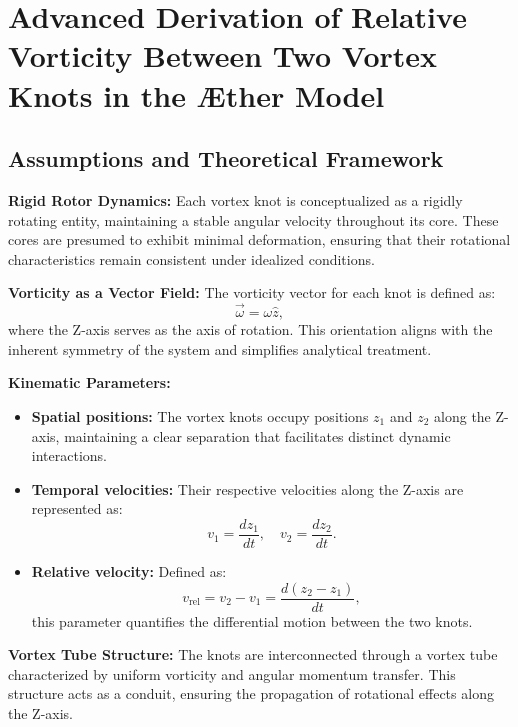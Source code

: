 

    \section{Advanced Derivation of Relative Vorticity Between Two Vortex Knots in the Æther Model}

    \subsection*{Assumptions and Theoretical Framework}
    \textbf{Rigid Rotor Dynamics:} Each vortex knot is conceptualized as a rigidly rotating entity, maintaining a stable angular velocity throughout its core. These cores are presumed to exhibit minimal deformation, ensuring that their rotational characteristics remain consistent under idealized conditions.

    \textbf{Vorticity as a Vector Field:} The vorticity vector for each knot is defined as:
    \begin{equation*}
        \vec{\omega} = \omega \hat{z},
    \end{equation*}
    where the Z-axis serves as the axis of rotation. This orientation aligns with the inherent symmetry of the system and simplifies analytical treatment.

    \textbf{Kinematic Parameters:}
    \begin{itemize}
        \item \textbf{Spatial positions:} The vortex knots occupy positions $z_1$ and $z_2$ along the Z-axis, maintaining a clear separation that facilitates distinct dynamic interactions.
        \item \textbf{Temporal velocities:} Their respective velocities along the Z-axis are represented as:
        \begin{equation*}
            v_1 = \frac{dz_1}{dt}, \quad v_2 = \frac{dz_2}{dt}.
        \end{equation*}
        \item \textbf{Relative velocity:} Defined as:
        \begin{equation*}
            v_\text{rel} = v_2 - v_1 = \frac{d(z_2 - z_1)}{dt},
        \end{equation*}
        this parameter quantifies the differential motion between the two knots.
    \end{itemize}

    \textbf{Vortex Tube Structure:} The knots are interconnected through a vortex tube characterized by uniform vorticity and angular momentum transfer. This structure acts as a conduit, ensuring the propagation of rotational effects along the Z-axis.

